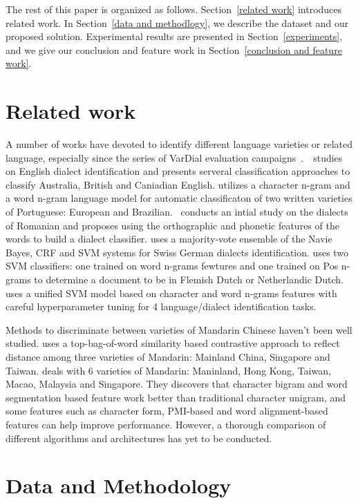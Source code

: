 \documentclass[11pt,a4paper]{article}
\begin{document}
The rest of this paper is organized as follows. Section~\ref{related work} introduces related work. In Section~\ref{data and methodlogy}, we describe the dataset and our proposed solution. Experimental results are presented in Section~\ref{experiments}, and we give our conclusion and feature work in Section~\ref{conclusion and feature work}.

\section{Related work\label{related work}}
A number of works have devoted to identify different language varieties or related language, especially since the series of VarDial evaluation campaigns~\cite{W16-4801, W17-1201, W18-3901}.~\cite{U13-1003}~studies on English dialect identification and presents serveral classification approaches to classify Australia, British and Caniadian English. \cite{Zampieri2012AutomaticIO} utilizes a character n-gram and a word n-gram language model for automatic classificaton of two written varieties of Portuguese: European and Brazilian. \cite{Ciobanu2016ACP}~conducts an intial study on the dialects of Romanian and proposes using the orthographic and phonetic features of the words to build a dialect classifier. \cite{W17-1221} uses a majority-vote ensemble of the Navie Bayes, CRF and SVM systems for Swiss German dialects identification. \cite{W18-3922} uses two SVM classifiers: one trained on word n-grams fewtures and one trained on Pos n-grams to determine a document to be in Flemish Dutch or Netherlandic Dutch. \cite{W18-3906} uses a unified SVM model based on character and word n-grams features with careful hyperparameter tuning for 4 language/dialect identification tasks.

Methods to discriminate between varieties of Mandarin Chinese haven't been well studied. \cite{Y08-1042} uses a top-bag-of-word similarity based contrastive approach to reflect distance among three varieties of Mandarin: Mainland China, Singapore and Taiwan. \cite{IJNLC2016:5} deals with 6 varieties of Mandarin: Maninland, Hong Kong, Taiwan, Macao, Malaysia and Singapore. They discovers that character bigram and word segmentation based feature work better than traditional character unigram, and some features such as character form, PMI-based and word alignment-based features can help improve performance. However, a thorough comparison of different algorithms and architectures has yet to be conducted.

\section{Data and Methodology\label{data and methodlogy}}
\end{document}
